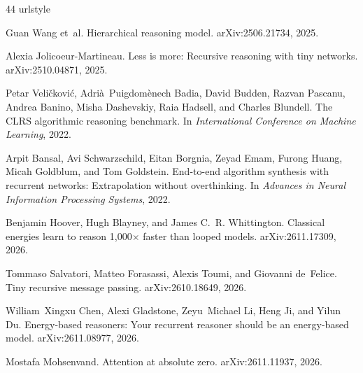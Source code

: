 \documentclass[10pt]{article}
\begin{document}
\begin{thebibliography}{44}
\providecommand{\natexlab}[1]{#1}
\providecommand{\url}[1]{\texttt{#1}}
\expandafter\ifx\csname urlstyle\endcsname\relax
  \providecommand{\doi}[1]{doi: #1}\else
  \providecommand{\doi}{doi: \begingroup \urlstyle{rm}\Url}\fi

Guan Wang et~al.
\newblock Hierarchical reasoning model.
\newblock arXiv:2506.21734, 2025.

Alexia Jolicoeur-Martineau.
\newblock Less is more: Recursive reasoning with tiny networks.
\newblock arXiv:2510.04871, 2025.

Petar Veli{\v{c}}kovi{\'c}, Adri{\`a}~Puigdom{\`e}nech Badia, David Budden,
  Razvan Pascanu, Andrea Banino, Misha Dashevskiy, Raia Hadsell, and Charles
  Blundell.
\newblock The {CLRS} algorithmic reasoning benchmark.
\newblock In \emph{International Conference on Machine Learning}, 2022.

Arpit Bansal, Avi Schwarzschild, Eitan Borgnia, Zeyad Emam, Furong Huang, Micah
  Goldblum, and Tom Goldstein.
\newblock End-to-end algorithm synthesis with recurrent networks: Extrapolation
  without overthinking.
\newblock In \emph{Advances in Neural Information Processing Systems}, 2022.

Benjamin Hoover, Hugh Blayney, and James C.~R. Whittington.
\newblock Classical energies learn to reason 1,000$\times$ faster than looped
  models.
\newblock arXiv:2611.17309, 2026.

Tommaso Salvatori, Matteo Forasassi, Alexis Toumi, and Giovanni de~Felice.
\newblock Tiny recursive message passing.
\newblock arXiv:2610.18649, 2026.

William~Xingxu Chen, Alexi Gladstone, Zeyu~Michael Li, Heng Ji, and Yilun Du.
\newblock Energy-based reasoners: Your recurrent reasoner should be an
  energy-based model.
\newblock arXiv:2611.08977, 2026.

Mostafa Mohsenvand.
\newblock Attention at absolute zero.
\newblock arXiv:2611.11937, 2026.


\end{thebibliography}
\end{document}
